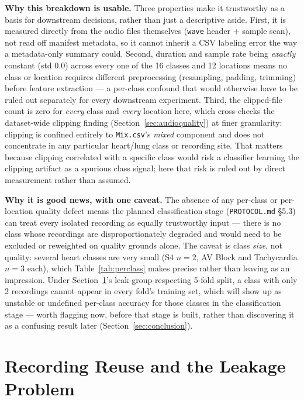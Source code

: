 \documentclass[11pt]{article}
\begin{document}
\textbf{Why this breakdown is usable.} Three properties make it trustworthy
as a basis for downstream decisions, rather than just a descriptive
aside. First, it is measured directly from the audio files themselves
(\texttt{wave} header + sample scan), not read off manifest metadata, so it
cannot inherit a CSV labeling error the way a metadata-only summary could.
Second, duration and sample rate being \emph{exactly} constant (std 0.0)
across every one of the 16 classes and 12 locations means no class or
location requires different preprocessing (resampling, padding, trimming)
before feature extraction --- a per-class confound that would otherwise have
to be ruled out separately for every downstream experiment. Third, the
clipped-file count is zero for \emph{every} class and \emph{every} location
here, which cross-checks the dataset-wide clipping finding
(Section~\ref{sec:audioquality}) at finer granularity: clipping is confined
entirely to \texttt{Mix.csv}'s \emph{mixed} component and does not
concentrate in any particular heart/lung class or recording site. That
matters because clipping correlated with a specific class would risk a
classifier learning the clipping artifact as a spurious class signal; here
that risk is ruled out by direct measurement rather than assumed.

\textbf{Why it is good news, with one caveat.} The absence of any per-class
or per-location quality defect means the planned classification stage
(\texttt{PROTOCOL.md} \S5.3) can treat every isolated recording as equally
trustworthy input --- there is no class whose recordings are disproportionately
degraded and would need to be excluded or reweighted on quality grounds
alone. The caveat is class \emph{size}, not quality: several heart classes
are very small (S4 $n{=}2$, AV Block and Tachycardia $n{=}3$ each), which
Table~\ref{tab:perclass} makes precise rather than leaving as an impression.
Under Section~\ref{sec:leakage}'s leak-group-respecting 5-fold split, a
class with only 2 recordings cannot appear in every fold's training set,
which will show up as unstable or undefined per-class accuracy for those
classes in the classification stage --- worth flagging now, before that
stage is built, rather than discovering it as a confusing result later
(Section~\ref{sec:conclusion}).

\section{Recording Reuse and the Leakage Problem}
\label{sec:leakage}
\end{document}
